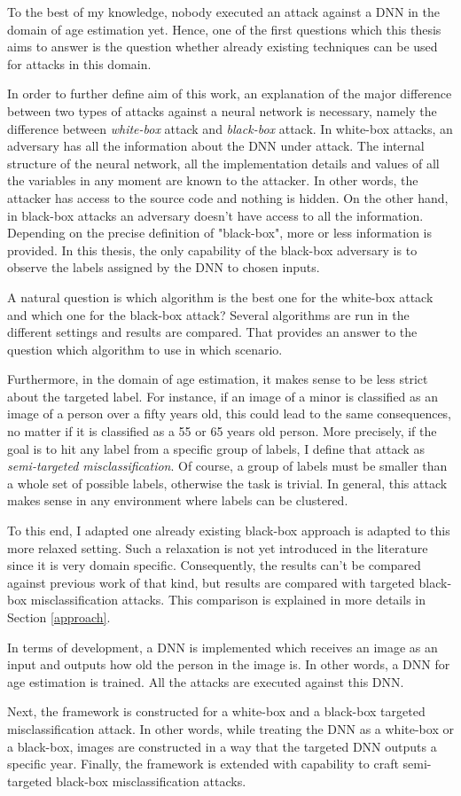 To the best of my knowledge, nobody executed an attack against a DNN in the domain of age estimation yet. Hence, one of the first questions which this thesis aims to answer is the question whether already existing techniques can be used for attacks in this domain.

In order to further define aim of this work, an explanation of the major difference between two types of attacks against a neural network is necessary, namely the difference between \textit{white-box} attack and \textit{black-box} attack. 
In white-box attacks, an adversary has all the information about the DNN under attack. The internal structure of the neural network, all the implementation details and values of all the variables in any moment are known to the attacker. In other words, the attacker has access to the source code and nothing is hidden.
On the other hand, in black-box attacks an adversary doesn't have access to all the information. Depending on the precise definition of "black-box", more or less information is provided. In this thesis, the only capability of the black-box adversary is to observe the labels assigned by the DNN to chosen inputs.

A natural question is which algorithm is the best one for the white-box attack and which one for the black-box attack? Several algorithms are run in the different settings and results are compared. That provides an answer to the question which algorithm to use in which scenario.

Furthermore, in the domain of age estimation, it makes sense to be less strict about the targeted label. For instance, if an image of a minor is classified as an image of a person over a fifty years old, this could lead to the same consequences, no matter if it is classified as a 55 or 65 years old person. More precisely, if the goal is to hit any label from a specific group of labels, I define that attack as \textit{semi-targeted misclassification}. Of course, a group of labels must be smaller than a whole set of possible labels, otherwise the task is trivial. In general, this attack makes sense in any environment where labels can be clustered.

To this end, I adapted one already existing black-box approach is adapted to this more relaxed setting. Such a relaxation is not yet introduced in the literature since it is very domain specific. Consequently, the results can't be compared against previous work of that kind, but results are compared with targeted black-box misclassification attacks. This comparison is explained in more details in Section \ref{approach}. 

In terms of development, a DNN is implemented which receives an image as an input and outputs how old the person in the image is. In other words, a DNN for age estimation is trained. All the attacks are executed against this DNN. 

Next, the framework is constructed for a white-box and a black-box targeted misclassification attack. In other words, while treating the DNN as a white-box or a black-box, images  are constructed in a way that the targeted DNN outputs a specific year. Finally, the framework is extended with capability to craft semi-targeted black-box misclassification attacks.